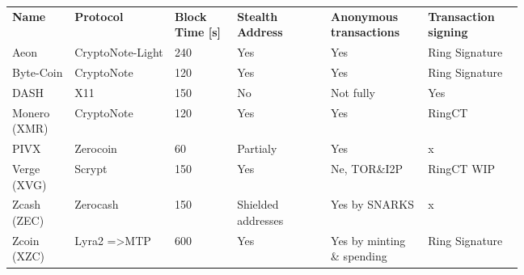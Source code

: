\documentclass[
  printed, %
  table,   %
  nolof,     %
  nolot,     %
           oneside, color
]{fithesis3}
\begin{document}

\begin{figure}[H]
\centering
\begin{tabular}{p{0.1\linewidth}p{0.16\linewidth}p{0.1\linewidth}p{0.15\linewidth}p{0.15\linewidth}p{0.15\linewidth}}
\textbf{Name}        & \textbf{Protocol}                & \textbf{Block Time {[}s{]}} & \textbf{Stealth Address    }      & \textbf{Anonymous transactions} & \textbf{Transaction signing}  \\
Aeon         & CryptoNote-Light        & 240                & Yes                      & Yes                & Ring Signature \\
Byte-Coin     & CryptoNote              & 120                & Yes                      & Yes                & Ring Signature \\
DASH         & X11                     & 150                & No                       & Not fully           & Yes            \\
Monero (XMR) & CryptoNote              & 120                & Yes                      & Yes                & RingCT         \\
PIVX         & Zerocoin                & 60                 & Partialy & Yes                & x              \\
Verge (XVG)  & Scrypt                  & 150                & Yes                      & Ne, TOR\&I2P       & RingCT WIP     \\
Zcash (ZEC)  & Zerocash                & 150                & Shielded addresses  & Yes by SNARKS    & x              \\
Zcoin (XZC)  & Lyra2 =\textgreater MTP & 600                & Yes                      & Yes by minting \& spending  & Ring Signature

\end{tabular}
\label{table:monero-alternatives}

\end{figure}
\end{document}

